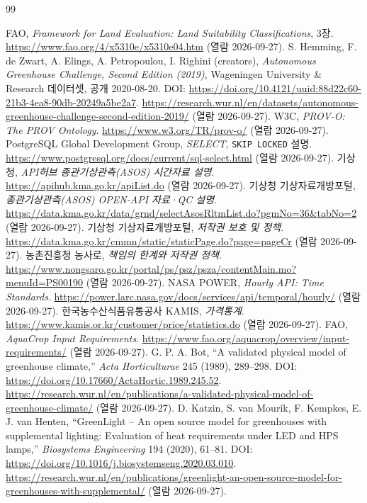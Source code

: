 \documentclass[11pt,a4paper]{article}
\begin{document}
\begin{thebibliography}{99}
{}
 FAO, \emph{Framework for Land Evaluation: Land Suitability Classifications}, 3장. \url{https://www.fao.org/4/x5310e/x5310e04.htm} (열람 2026-09-27).
 S. Hemming, F. de Zwart, A. Elings, A. Petropoulou, I. Righini (creators), \emph{Autonomous Greenhouse Challenge, Second Edition (2019)}, Wageningen University \& Research 데이터셋, 공개 2020-08-20. DOI: \url{https://doi.org/10.4121/uuid:88d22c60-21b3-4ea8-90db-20249a5be2a7}. \url{https://research.wur.nl/en/datasets/autonomous-greenhouse-challenge-second-edition-2019/} (열람 2026-09-27).
 W3C, \emph{PROV-O: The PROV Ontology}. \url{https://www.w3.org/TR/prov-o/} (열람 2026-09-27).
 PostgreSQL Global Development Group, \emph{SELECT}, \texttt{SKIP LOCKED} 설명. \url{https://www.postgresql.org/docs/current/sql-select.html} (열람 2026-09-27).
 기상청, \emph{API허브 종관기상관측(ASOS) 시간자료 설명}. \url{https://apihub.kma.go.kr/apiList.do} (열람 2026-09-27).
 기상청 기상자료개방포털, \emph{종관기상관측(ASOS) OPEN-API 자료·QC 설명}. \url{https://data.kma.go.kr/data/grnd/selectAsosRltmList.do?pgmNo=36&tabNo=2} (열람 2026-09-27).
 기상청 기상자료개방포털, \emph{저작권 보호 및 정책}. \url{https://data.kma.go.kr/cmmn/static/staticPage.do?page=pageCr} (열람 2026-09-27).
 농촌진흥청 농사로, \emph{책임의 한계와 저작권 정책}. \url{https://www.nongsaro.go.kr/portal/ps/psz/psza/contentMain.mo?menuId=PS00190} (열람 2026-09-27).
 NASA POWER, \emph{Hourly API: Time Standards}. \url{https://power.larc.nasa.gov/docs/services/api/temporal/hourly/} (열람 2026-09-27).
 한국농수산식품유통공사 KAMIS, \emph{가격통계}. \url{https://www.kamis.or.kr/customer/price/statistics.do} (열람 2026-09-27).
 FAO, \emph{AquaCrop Input Requirements}. \url{https://www.fao.org/aquacrop/overview/input-requirements/} (열람 2026-09-27).
 G. P. A. Bot, ``A validated physical model of greenhouse climate,'' \emph{Acta Horticulturae} 245 (1989), 289--298. DOI: \url{https://doi.org/10.17660/ActaHortic.1989.245.52}. \url{https://research.wur.nl/en/publications/a-validated-physical-model-of-greenhouse-climate/} (열람 2026-09-27).
 D. Katzin, S. van Mourik, F. Kempkes, E. J. van Henten, ``GreenLight -- An open source model for greenhouses with supplemental lighting: Evaluation of heat requirements under LED and HPS lamps,'' \emph{Biosystems Engineering} 194 (2020), 61--81. DOI: \url{https://doi.org/10.1016/j.biosystemseng.2020.03.010}. \url{https://research.wur.nl/en/publications/greenlight-an-open-source-model-for-greenhouses-with-supplemental/} (열람 2026-09-27).

\end{thebibliography}
\end{document}
